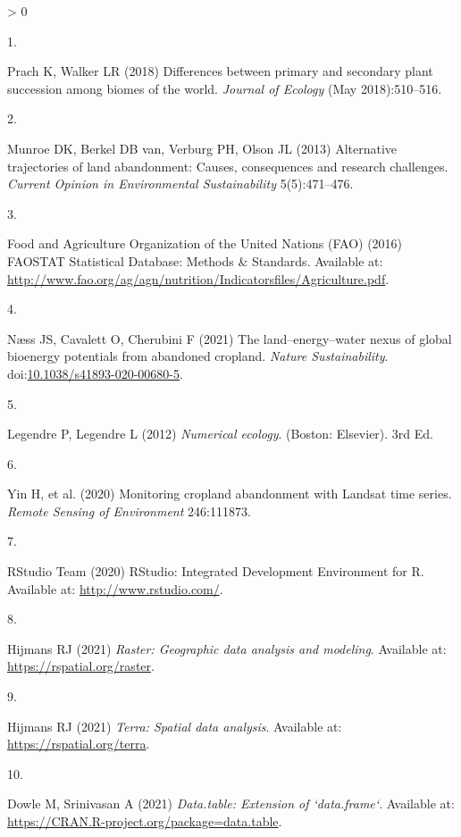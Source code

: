 \documentclass[9pt,lineno]{pnas-new}
\newlength{\csllabelwidth}
\newlength{\cslhangindent}
\newenvironment{CSLReferences}[2] %
 {%
  \setlength{\parindent}{0pt}
  \ifodd #1 \everypar{\setlength{\hangindent}{\cslhangindent}}\ignorespaces\fi
  \ifnum #2 > 0
  \setlength{\parskip}{#2\baselineskip}
  \fi
 }%
 {}
\newcommand{\CSLLeftMargin}[1]{\parbox[t]{\csllabelwidth}{#1}}
\newcommand{\CSLRightInline}[1]{\parbox[t]{\linewidth - \csllabelwidth}{#1}\break}
\begin{document}
\hypertarget{refs}{}
\begin{CSLReferences}{0}{0}
\leavevmode\hypertarget{ref-Prach2018}{}%
\CSLLeftMargin{1. }
\CSLRightInline{Prach K, Walker LR (2018) {Differences between primary and secondary plant succession among biomes of the world}. \emph{Journal of Ecology} (May 2018):510--516.}

\leavevmode\hypertarget{ref-Munroe2013}{}%
\CSLLeftMargin{2. }
\CSLRightInline{Munroe DK, Berkel DB van, Verburg PH, Olson JL (2013) {Alternative trajectories of land abandonment: Causes, consequences and research challenges}. \emph{Current Opinion in Environmental Sustainability} 5(5):471--476.}

\leavevmode\hypertarget{ref-FAO2016}{}%
\CSLLeftMargin{3. }
\CSLRightInline{Food and Agriculture Organization of the United Nations (FAO) (2016) {FAOSTAT Statistical Database: Methods {\&} Standards}. Available at: \url{http://www.fao.org/ag/agn/nutrition/Indicatorsfiles/Agriculture.pdf}.}

\leavevmode\hypertarget{ref-Naess2021}{}%
\CSLLeftMargin{4. }
\CSLRightInline{Næss JS, Cavalett O, Cherubini F (2021) {The land--energy--water nexus of global bioenergy potentials from abandoned cropland}. \emph{Nature Sustainability}. doi:\href{https://doi.org/10.1038/s41893-020-00680-5}{10.1038/s41893-020-00680-5}.}

\leavevmode\hypertarget{ref-Legendre2012}{}%
\CSLLeftMargin{5. }
\CSLRightInline{Legendre P, Legendre L (2012) \emph{{Numerical ecology}}. (Boston: Elsevier). 3rd Ed.}

\leavevmode\hypertarget{ref-Yin2020}{}%
\CSLLeftMargin{6. }
\CSLRightInline{Yin H, et al. (2020) {Monitoring cropland abandonment with Landsat time series}. \emph{Remote Sensing of Environment} 246:111873.}

\leavevmode\hypertarget{ref-RStudio}{}%
\CSLLeftMargin{7. }
\CSLRightInline{RStudio Team (2020) {RStudio: Integrated Development Environment for R}. Available at: \url{http://www.rstudio.com/}.}

\leavevmode\hypertarget{ref-R-raster}{}%
\CSLLeftMargin{8. }
\CSLRightInline{Hijmans RJ (2021) \emph{Raster: Geographic data analysis and modeling}. Available at: \url{https://rspatial.org/raster}.}

\leavevmode\hypertarget{ref-R-terra}{}%
\CSLLeftMargin{9. }
\CSLRightInline{Hijmans RJ (2021) \emph{Terra: Spatial data analysis}. Available at: \url{https://rspatial.org/terra}.}

\leavevmode\hypertarget{ref-R-data.table}{}%
\CSLLeftMargin{10. }
\CSLRightInline{Dowle M, Srinivasan A (2021) \emph{Data.table: Extension of `data.frame`}. Available at: \url{https://CRAN.R-project.org/package=data.table}.}


\end{CSLReferences}
\end{document}
